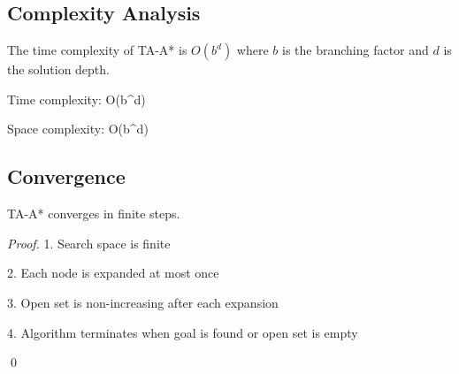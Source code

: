 \subsection{Complexity Analysis}

\begin{theorem}
The time complexity of TA-A* is $O(b^d)$ where $b$ is the branching factor and $d$ is the solution depth.
\end{theorem}

Time complexity: O(b^d)

Space complexity: O(b^d)

\subsection{Convergence}

\begin{theorem}
TA-A* converges in finite steps.
\end{theorem}

\begin{proof}
1. Search space is finite

2. Each node is expanded at most once

3. Open set is non-increasing after each expansion

4. Algorithm terminates when goal is found or open set is empty


\qed
\end{proof}
